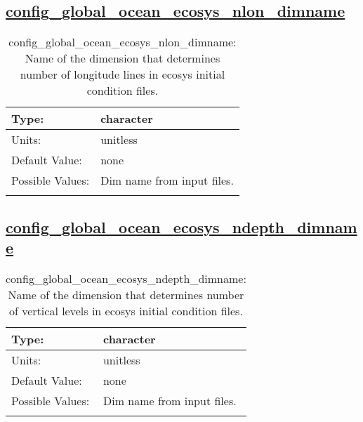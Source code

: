 \subsection[config\_global\_ocean\_ecosys\_nlon\_dimname]{\hyperref[sec:nm_tab_global_ocean]{config\_global\_ocean\_ecosys\_nlon\_dimname}}
\label{subsec:nm_sec_config_global_ocean_ecosys_nlon_dimname}
\begin{center}
\begin{longtable}{| p{2.0in} || p{4.0in} |}
    \hline
    Type: & character \\
    \hline
    Units: & \si{unitless} \\
    \hline
    Default Value: & none \\
    \hline
    Possible Values: & Dim name from input files. \\
    \hline
    \caption{config\_global\_ocean\_ecosys\_nlon\_dimname: Name of the dimension that determines number of longitude lines in ecosys initial condition files.}
\end{longtable}
\end{center}
\subsection[config\_global\_ocean\_ecosys\_ndepth\_dimname]{\hyperref[sec:nm_tab_global_ocean]{config\_global\_ocean\_ecosys\_ndepth\_dimname}}
\label{subsec:nm_sec_config_global_ocean_ecosys_ndepth_dimname}
\begin{center}
\begin{longtable}{| p{2.0in} || p{4.0in} |}
    \hline
    Type: & character \\
    \hline
    Units: & \si{unitless} \\
    \hline
    Default Value: & none \\
    \hline
    Possible Values: & Dim name from input files. \\
    \hline
    \caption{config\_global\_ocean\_ecosys\_ndepth\_dimname: Name of the dimension that determines number of vertical levels in ecosys initial condition files.}
\end{longtable}
\end{center}
